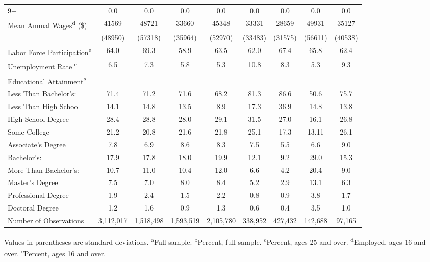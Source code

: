 \documentclass[11pt]{article}
\theoremstyle{definition}
\begin{document}
{\begin{center}
\begin{tabular}{l c c c c c c c c}
\hspace{2.5mm}9+ & 0.0 & 0.0 & 0.0 & 0.0 & 0.0 & 0.0 & 0.0 & 0.0 \\
Mean Annual Wages\textsuperscript{d} (\$) & 41569 & 48721 & 33660 & 45348 & 33331 & 28659 & 49931 & 35127 \\
 & (48950) & (57318) & (35964) & (52970) & (33483) & (31575) & (56611) & (40538) \\
Labor Force Participation\textsuperscript{e} & 64.0 & 69.3 & 58.9  & 63.5 & 62.0  & 67.4  & 65.8  & 62.4 \\
Unemployment Rate \textsuperscript{e} & 6.5 & 7.3 & 5.8  & 5.3 & 10.8 & 8.3 & 5.3 & 9.3 \\
\underline{Educational Attainment\textsuperscript{c}}  &  &  &  &  &  &  &  &  \\
Less Than Bachelor's:  & 71.4 & 71.2 & 71.6 & 68.2 & 81.3 & 86.6 & 50.6 & 75.7 \\
\hspace{2.5mm}Less Than High School & 14.1 & 14.8 & 13.5 & 8.9 & 17.3 & 36.9 & 14.8 & 13.8 \\
\hspace{2.5mm}High School Degree & 28.4 & 28.8 & 28.0 & 29.1 & 31.5 & 27.0 & 16.1 & 26.8 \\
\hspace{2.5mm}Some College & 21.2 & 20.8 & 21.6 & 21.8 & 25.1 & 17.3 & 13.11 & 26.1 \\
\hspace{2.5mm}Associate's Degree & 7.8 & 6.9 & 8.6 & 8.3 & 7.5 & 5.5 & 6.6 & 9.0 \\
Bachelor's:  & 17.9 & 17.8 & 18.0 & 19.9 & 12.1 & 9.2 & 29.0 & 15.3 \\
More Than Bachelor's:  & 10.7 & 11.0 & 10.4 & 12.0 & 6.6 & 4.2 & 20.4 & 9.0 \\
\hspace{2.5mm}Master's Degree & 7.5 & 7.0 & 8.0 & 8.4 & 5.2 & 2.9 & 13.1 & 6.3 \\
\hspace{2.5mm}Professional Degree & 1.9 & 2.4 & 1.5 & 2.2 & 0.8 & 0.9 & 3.8 & 1.7 \\
\hspace{2.5mm}Doctoral Degree & 1.2 & 1.6 & 0.9 & 1.3 & 0.6 & 0.4 & 3.5 & 1.0 \\
\hline
Number of Observations & 3,112,017 & 1,518,498 & 1,593,519 & 2,105,780 & 338,952 & 427,432 & 142,688 & 97,165 \\
\hline\hline
\end{tabular} 
\end{center}} 
\small{Values in parentheses are standard deviations. \textsuperscript{a}Full sample. \textsuperscript{b}Percent, full sample. \textsuperscript{c}Percent, ages 25 and over.  \textsuperscript{d}Employed, ages 16 and over. \textsuperscript{e}Percent, ages 16 and over. }
\end{document}
